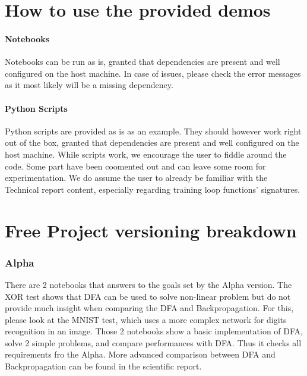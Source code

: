 \documentclass[english]{article}
\begin{document}



\section{How to use the provided demos}

\paragraph{Notebooks} Notebooks can be run as is, granted that dependencies are present and well configured on the host machine. In case of issues, please check the error messages as it most likely will be a missing dependency.

\paragraph{Python Scripts} Python scripts are provided as is as an example. They should however work right out of the box, granted that dependencies are present and well configured on the host machine. While scripts work, we encourage the user to fiddle around the code. Some part have been coomented out and can leave some room for experimentation. We do assume the user to already be familiar with the Technical report content, especially regarding training loop functions' signatures.


\section{Free Project versioning breakdown}

\subsubsection{Alpha}
There are 2 notebooks that answers to the goals set by the Alpha version. The XOR test shows that DFA can be used to solve non-linear problem but do not provide much insight when comparing the DFA and Backpropagation. For this, please look at the MNIST test, which uses a more complex network for digits recognition in an image.
Those 2 notebooks show a basic implementation of DFA, solve 2 simple problems, and compare performances with DFA. Thus it checks all requirements fro the Alpha. More advanced comparison between DFA and Backpropagation can be found in the scientific report.
\end{document}
